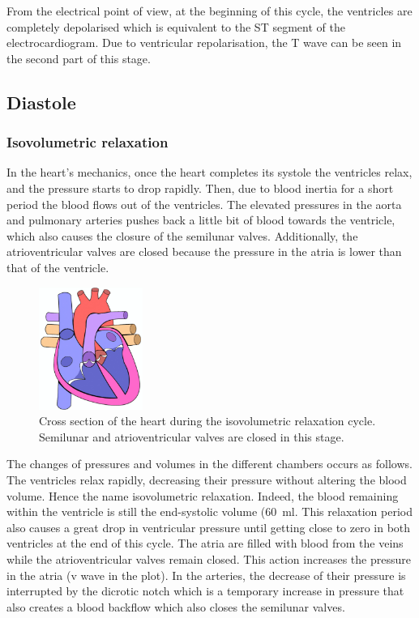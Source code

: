 From the electrical point of view, at the beginning of this cycle, the ventricles are completely depolarised which is equivalent to the ST segment of the electrocardiogram. Due to ventricular repolarisation, the T wave can be seen in the second part of this stage. 

\subsection{Diastole}
\subsubsection{Isovolumetric relaxation}
In the heart's mechanics, once the heart completes its systole the ventricles relax, and the pressure starts to drop rapidly. Then, due to blood inertia for a short period the blood flows out of the ventricles. The elevated pressures in the aorta and pulmonary arteries pushes back a little bit of blood towards the ventricle, which also causes the closure of the semilunar valves. Additionally, the atrioventricular valves are closed because the pressure in the atria is lower than that of the ventricle.

\begin{figure}[!htpb]
		\centering
		\includegraphics[height=4cm,keepaspectratio]{figure_9}
		\caption[Heart during isovolumetric relaxation cycle]{Cross section of the heart during the isovolumetric relaxation cycle. Semilunar and atrioventricular valves are closed in this stage.}
		\label{fig:heart isovolumetric relaxation}
\end{figure}

The changes of pressures and volumes in the different chambers occurs as follows. The ventricles relax rapidly, decreasing their pressure without altering the blood volume. Hence the name isovolumetric relaxation. Indeed, the blood remaining within the ventricle is still the end-systolic volume (\SI{60}{\milli\litre}. This relaxation period also causes a great drop in ventricular pressure until getting close to zero in both ventricles at the end of this cycle. The atria are filled with blood from the veins while the atrioventricular valves remain closed. This action increases the pressure in the atria (v wave in the plot). In the arteries, the decrease of their pressure is interrupted by the dicrotic notch which is a temporary increase in pressure that also creates a blood backflow which also closes the semilunar valves. 

